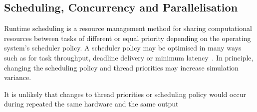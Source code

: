 






\DIFaddend \subsection{Scheduling, Concurrency and Parallelisation}
\DIFaddbegin 


\DIFaddend Runtime scheduling is a resource management method for sharing computational resources between tasks of different or equal priority \DIFdelbegin {}\DIFdelend depending on the operating system's scheduler policy. A scheduler policy may be optimised in many ways such as for task throughput, deadline delivery or minimum latency~\cite{liu1973scheduling}. %
In principle, changing the scheduling policy and thread priorities may increase simulation variance. 

It is \DIFdelbegin {}\DIFdelend unlikely that changes to thread priorities or scheduling policy would occur during repeated \DIFdelbegin {}\DIFdelend \DIFaddbegin {}\DIFaddend the same hardware and \DIFdelbegin {}\DIFdelend \DIFaddbegin {}\DIFaddend the same output\DIFdelbegin {}%

